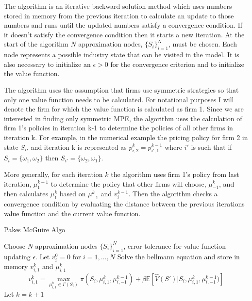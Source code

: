 \documentclass[12pt]{article}
\newcommand{\norm}[1]{\left\lVert#1\right\rVert}
\begin{document}
The \citet{1992_Pakes_McGuire_NBER} algorithm is an iterative backward solution method which uses numbers stored in memory from the previous iteration to calculate an update to those numbers and runs until the updated numbers satisfy a convergence condition. If it doesn't satisfy the convergence condition then it starts a new iteration. At the start of the algorithm $N$ approximation nodes, $\{S_i\}_{i=1}^N$, must be chosen. Each node represents a possible industry state that can be visited in the model. It is also necessary to initialize an $\epsilon>0$ for the convergence criterion and to initialize the value function.

The algorithm uses the assumption that firms use symmetric strategies so that only one value function needs to be calculated. For notational purposes I will denote the firm for which the value function is calculated as firm 1. Since we are interested in finding only symmetric MPE, the \citet{1992_Pakes_McGuire_NBER} algorithm uses the calculation of firm 1's policies in iteration k-1 to determine the policies of all other firms in iteration k. For example, in the numerical example the pricing policy for firm 2 in state $S_i$, and iteration k is represented as $p^{k}_{i,2}=p^{k-1}_{i',1}$ where $i'$ is such that if $S_i=\{\omega_1,\omega_2\}$ then $S_{i'}=\{\omega_2,\omega_1\}$.

More generally, for each iteration $k$ the algorithm uses firm 1's policy from last iteration, $\mu^{k-1}_1$ to determine the policy that other firms will choose, $\mu^k_{-1}$, and then calculates $\mu^k_1$ based on $\mu^k_{-1}$ and $v_i^{k-1}$. Then the algorithm checks a convergence condition by evaluating the distance between the previous iterations value function and the current value function.

\begin{algorithm}[H]
  \caption{Pakes McGuire Algo}
  \begin{algorithmic}[1]
    \Procedure{}{} Choose $N$ approximation nodes $\{S_i\}_{i=1}^N$, error tolerance for value function updating $\epsilon$.
    \State Let $v^0_i=0$ for $i=1,\dots,N$
    \While{$\norm{v^{k}_1-v^{k-1}_1} > \frac{\epsilon (1-\beta)}{2\beta}$}
    \State Solve the bellmann equation and store in memory $v^k_{i,1}$ and $\mu^k_{i,1}$
    \begin{equation*}
      v^k_{i,1}=\max_{\mu^k_{i,1} \in \Gamma(S_i)} \pi(S_i, \mu^k_{i,1}, \mu^{k-1}_{i,-1})+ \beta\mathbb{E}[\hat{V}(S')|S_i,\mu^k_{i,1},\mu^{k-1}_{i,-1})]
    \end{equation*}
    \State Let $k=k+1$
    \EndFor
    \EndWhile
    \EndProcedure
  \end{algorithmic}
\end{algorithm}
\end{document}
